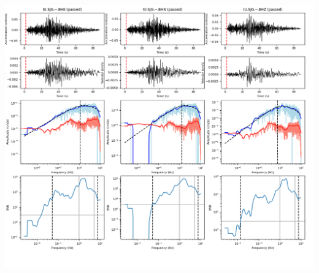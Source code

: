 \documentclass[9pt]{article}
\begin{document}
\includegraphics[height=5.75in]
    {plots/19930810073756_IU.SJG.BH.png}
\end{document}
